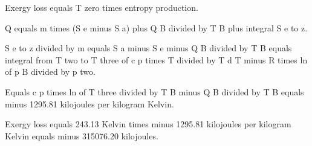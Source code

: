Exergy loss equals T zero times entropy production.  

Q equals m times (S e minus S a) plus Q B divided by T B plus integral S e to z.  

S e to z divided by m equals S a minus S e minus Q B divided by T B equals integral from T two to T three of c p times T divided by T d T minus R times ln of p B divided by p two.  

Equals c p times ln of T three divided by T B minus Q B divided by T B equals minus 1295.81 kilojoules per kilogram Kelvin.  

Exergy loss equals 243.13 Kelvin times minus 1295.81 kilojoules per kilogram Kelvin equals minus 315076.20 kilojoules.